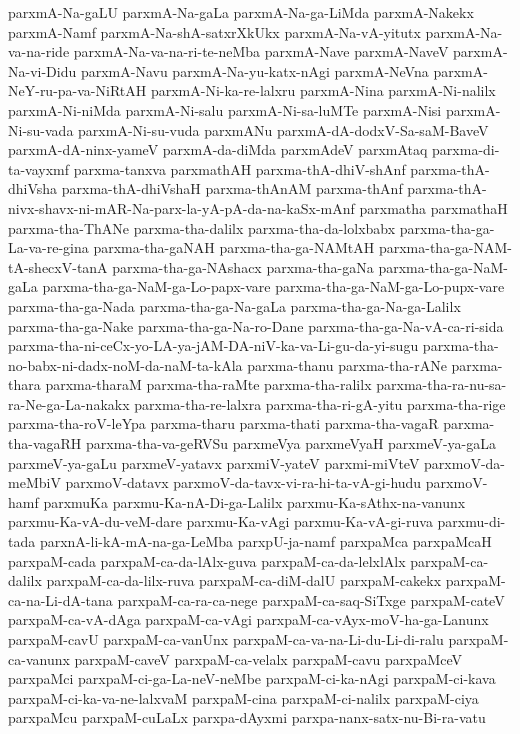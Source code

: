 {parxmA-Na-gaLU
parxmA-Na-gaLa
parxmA-Na-ga-LiMda
parxmA-Nakekx
parxmA-Namf
parxmA-Na-shA-satxrXkUkx
parxmA-Na-vA-yitutx
parxmA-Na-va-na-ride
parxmA-Na-va-na-ri-te-neMba
parxmA-Nave
parxmA-NaveV
parxmA-Na-vi-Didu
parxmA-Navu
parxmA-Na-yu-katx-nAgi
parxmA-NeVna
parxmA-NeY-ru-pa-va-NiRtAH
parxmA-Ni-ka-re-lalxru
parxmA-Nina
parxmA-Ni-nalilx
parxmA-Ni-niMda
parxmA-Ni-salu
parxmA-Ni-sa-luMTe
parxmA-Nisi
parxmA-Ni-su-vada
parxmA-Ni-su-vuda
parxmANu
parxmA-dA-dodxV-Sa-saM-BaveV
parxmA-dA-ninx-yameV
parxmA-da-diMda
parxmAdeV
parxmAtaq
parxma-di-ta-vayxmf
parxma-tanxva
parxmathAH
parxma-thA-dhiV-shAnf
parxma-thA-dhiVsha
parxma-thA-dhiVshaH
parxma-thAnAM
parxma-thAnf
parxma-thA-nivx-shavx-ni-mAR-Na-parx-la-yA-pA-da-na-kaSx-mAnf
parxmatha
parxmathaH
parxma-tha-ThANe
parxma-tha-dalilx
parxma-tha-da-lolxbabx
parxma-tha-ga-La-va-re-gina
parxma-tha-gaNAH
parxma-tha-ga-NAMtAH
parxma-tha-ga-NAM-tA-shecxV-tanA
parxma-tha-ga-NAshacx
parxma-tha-gaNa
parxma-tha-ga-NaM-gaLa
parxma-tha-ga-NaM-ga-Lo-papx-vare
parxma-tha-ga-NaM-ga-Lo-pupx-vare
parxma-tha-ga-Nada
parxma-tha-ga-Na-gaLa
parxma-tha-ga-Na-ga-Lalilx
parxma-tha-ga-Nake
parxma-tha-ga-Na-ro-Dane
parxma-tha-ga-Na-vA-ca-ri-sida
parxma-tha-ni-ceCx-yo-LA-ya-jAM-DA-niV-ka-va-Li-gu-da-yi-sugu
parxma-tha-no-babx-ni-dadx-noM-da-naM-ta-kAla
parxma-thanu
parxma-tha-rANe
parxma-thara
parxma-tharaM
parxma-tha-raMte
parxma-tha-ralilx
parxma-tha-ra-nu-sa-ra-Ne-ga-La-nakakx
parxma-tha-re-lalxra
parxma-tha-ri-gA-yitu
parxma-tha-rige
parxma-tha-roV-leYpa
parxma-tharu
parxma-thati
parxma-tha-vagaR
parxma-tha-vagaRH
parxma-tha-va-geRVSu
parxmeVya
parxmeVyaH
parxmeV-ya-gaLa
parxmeV-ya-gaLu
parxmeV-yatavx
parxmiV-yateV
parxmi-miVteV
parxmoV-da-meMbiV
parxmoV-datavx
parxmoV-da-tavx-vi-ra-hi-ta-vA-gi-hudu
parxmoV-hamf
parxmuKa
parxmu-Ka-nA-Di-ga-Lalilx
parxmu-Ka-sAthx-na-vanunx
parxmu-Ka-vA-du-veM-dare
parxmu-Ka-vAgi
parxmu-Ka-vA-gi-ruva
parxmu-di-tada
parxnA-li-kA-mA-na-ga-LeMba
parxpU-ja-namf
parxpaMca
parxpaMcaH
parxpaM-cada
parxpaM-ca-da-lAlx-guva
parxpaM-ca-da-lelxlAlx
parxpaM-ca-dalilx
parxpaM-ca-da-lilx-ruva
parxpaM-ca-diM-dalU
parxpaM-cakekx
parxpaM-ca-na-Li-dA-tana
parxpaM-ca-ra-ca-nege
parxpaM-ca-saq-SiTxge
parxpaM-cateV
parxpaM-ca-vA-dAga
parxpaM-ca-vAgi
parxpaM-ca-vAyx-moV-ha-ga-Lanunx
parxpaM-cavU
parxpaM-ca-vanUnx
parxpaM-ca-va-na-Li-du-Li-di-ralu
parxpaM-ca-vanunx
parxpaM-caveV
parxpaM-ca-velalx
parxpaM-cavu
parxpaMceV
parxpaMci
parxpaM-ci-ga-La-neV-neMbe
parxpaM-ci-ka-nAgi
parxpaM-ci-kava
parxpaM-ci-ka-va-ne-lalxvaM
parxpaM-cina
parxpaM-ci-nalilx
parxpaM-ciya
parxpaMcu
parxpaM-cuLaLx
parxpa-dAyxmi
parxpa-nanx-satx-nu-Bi-ra-vatu
}
